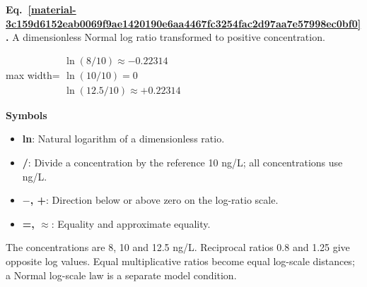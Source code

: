 \documentclass[11pt,a4paper]{article}
\begin{document}
\par\medskip
\noindent\begin{minipage}{\linewidth}
\label{material-3c159d6152eab0069f9ae1420190e6aa4467fc3254fac2d97aa7e57998ec0bf0}
\noindent\textbf{Eq.~\ref*{material-3c159d6152eab0069f9ae1420190e6aa4467fc3254fac2d97aa7e57998ec0bf0}.} A dimensionless Normal log ratio transformed to positive concentration.\par\nopagebreak
\begin{center}\begin{adjustbox}{max width=\linewidth}$\displaystyle \begin{gathered}\ln(8/10)\approx-0.22314\\\ln(10/10)=0\\\ln(12.5/10)\approx+0.22314\end{gathered}$\end{adjustbox}\end{center}

\par\noindent\textbf{Symbols}

\begin{itemize}\setlength{\itemsep}{1pt}\setlength{\parsep}{0pt}
\item \textbf{ln}: Natural logarithm of a dimensionless ratio.
\item \textbf{/}: Divide a concentration by the reference 10 ng/L; all concentrations use ng/L.
\item \textbf{\ensuremath{-}, +}: Direction below or above zero on the log-ratio scale.
\item \textbf{=, \ensuremath{\approx}}: Equality and approximate equality.
\end{itemize}

The concentrations are 8, 10 and 12.5 ng/L. Reciprocal ratios 0.8 and 1.25 give opposite log values. Equal multiplicative ratios become equal log-scale distances; a Normal log-scale law is a separate model condition.

\end{minipage}\par
\medskip
\end{document}
